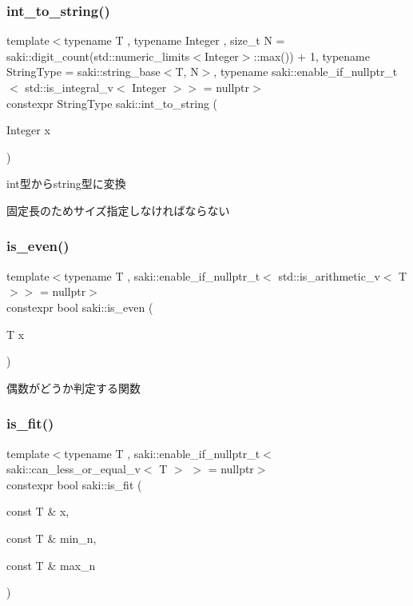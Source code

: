 \subsubsection{\texorpdfstring{int\+\_\+to\+\_\+string()}{int\_to\_string()}}
{\footnotesize\ttfamily template$<$typename T , typename Integer , size\+\_\+t N = saki\+::digit\+\_\+count(std\+::numeric\+\_\+limits$<$\+Integer$>$\+::max()) + 1, typename String\+Type  = saki\+::string\+\_\+base$<$\+T, N$>$, typename saki\+::enable\+\_\+if\+\_\+nullptr\+\_\+t$<$ std\+::is\+\_\+integral\+\_\+v$<$ Integer $>$$>$  = nullptr$>$ \\
constexpr String\+Type saki\+::int\+\_\+to\+\_\+string (\begin{DoxyParamCaption}\item[{Integer}]{x }\end{DoxyParamCaption})}



int型からstring型に変換 

固定長のためサイズ指定しなければならない \mbox{\label{namespacesaki_a9b20d1e721a18d69e8fa1e758be27818}} 
\subsubsection{\texorpdfstring{is\+\_\+even()}{is\_even()}}
{\footnotesize\ttfamily template$<$typename T , saki\+::enable\+\_\+if\+\_\+nullptr\+\_\+t$<$ std\+::is\+\_\+arithmetic\+\_\+v$<$ T $>$$>$  = nullptr$>$ \\
constexpr bool saki\+::is\+\_\+even (\begin{DoxyParamCaption}\item[{T}]{x }\end{DoxyParamCaption})}



偶数がどうか判定する関数 

\mbox{\label{namespacesaki_a45597d7382905409bada2316f78502fc}} 
\subsubsection{\texorpdfstring{is\+\_\+fit()}{is\_fit()}\hspace{0.1cm}{\footnotesize\ttfamily [1/2]}}
{\footnotesize\ttfamily template$<$typename T , saki\+::enable\+\_\+if\+\_\+nullptr\+\_\+t$<$ saki\+::can\+\_\+less\+\_\+or\+\_\+equal\+\_\+v$<$ T $>$ $>$  = nullptr$>$ \\
constexpr bool saki\+::is\+\_\+fit (\begin{DoxyParamCaption}\item[{const T \&}]{x,  }\item[{const T \&}]{min\+\_\+n,  }\item[{const T \&}]{max\+\_\+n }\end{DoxyParamCaption})}



